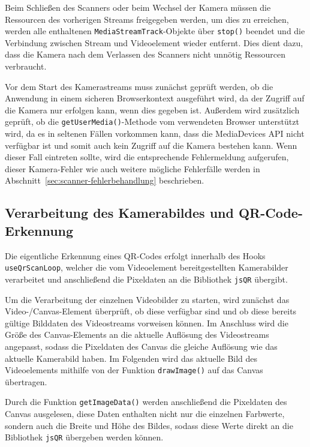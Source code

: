 ﻿\documentclass[oneside]{ausarbeitung}
\begin{document}
Beim Schließen des Scanners oder beim Wechsel der Kamera müssen die Ressourcen des vorherigen Streams freigegeben werden, um dies zu erreichen, 
werden alle enthaltenen \texttt{MediaStreamTrack}-Objekte über \texttt{stop()} beendet und die Verbindung zwischen Stream und Videoelement wieder
entfernt. Dies dient dazu, dass die Kamera nach dem Verlassen des Scanners nicht unnötig Ressourcen verbraucht.

Vor dem Start des Kamerastreams muss zunächst geprüft werden, ob die Anwendung in einem sicheren Browserkontext ausgeführt wird, da der Zugriff
auf die Kamera nur erfolgen kann, wenn dies gegeben ist. Außerdem wird zusätzlich geprüft, ob die \texttt{getUserMedia()}-Methode vom verwendeten
Browser unterstützt wird, da es in seltenen Fällen vorkommen kann, dass die MediaDevices API nicht verfügbar ist und somit auch kein Zugriff auf
die Kamera bestehen kann. Wenn dieser Fall eintreten sollte, wird die entsprechende Fehlermeldung aufgerufen, dieser Kamera-Fehler wie auch weitere
mögliche Fehlerfälle werden in Abschnitt~\ref{sec:scanner-fehlerbehandlung} beschrieben.



\subsection{Verarbeitung des Kamerabildes und QR-Code-Erkennung}
\label{sec:qr-bildverarbeitung}

Die eigentliche Erkennung eines QR-Codes erfolgt innerhalb des Hooks \texttt{useQrScanLoop}, welcher die vom Videoelement bereitgestellten 
Kamerabilder verarbeitet und anschließend die Pixeldaten an die Bibliothek \texttt{jsQR} übergibt.

Um die Verarbeitung der einzelnen Videobilder zu starten, wird zunächst das Video-/Canvas-Element überprüft, ob diese verfügbar sind und ob diese
bereits gültige Bilddaten des Videostreams vorweisen können. Im Anschluss wird die Größe des Canvas-Elements an die aktuelle Auflösung des
Videostreams angepasst, sodass die Pixeldaten des Canvas die gleiche Auflösung wie das aktuelle Kamerabild haben. Im Folgenden wird das
aktuelle Bild des Videoelements mithilfe von der Funktion \texttt{drawImage()} auf das Canvas übertragen.

Durch die Funktion \texttt{getImageData()} werden anschließend die Pixeldaten des Canvas ausgelesen, diese Daten enthalten nicht nur die einzelnen
Farbwerte, sondern auch die Breite und Höhe des Bildes, sodass diese Werte direkt an die Bibliothek \texttt{jsQR} übergeben werden können. 
\end{document}
